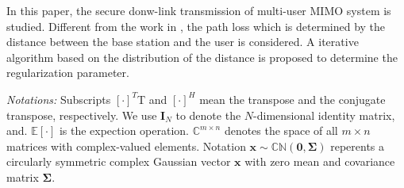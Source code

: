 \documentclass[12pt,journal,draftclsnofoot,onecolumn]{IEEEtran}
\begin{document}
 


In this paper, the secure donw-link transmission of multi-user MIMO system is studied. Different from the work in \cite{geraci2012secrecy,geraci2014physical}, the path loss which is determined by the distance between the base station and the user is considered. A iterative algorithm  based on the distribution of the distance is proposed to determine the regularization parameter.

\emph{Notations:} Subscripts $[\cdot]^T$T and $[\cdot]^H$ mean the transpose and
the conjugate transpose, respectively. We use $\mathbf{I}_{N}$  to denote the
$N$-dimensional identity matrix, and. $\mathbb{E}[\cdot]$ is the expection operation. $\mathbb{C}^{m \times n}$ denotes the space of all $m \times n$ matrices
with complex-valued elements. Notation $\mathbf{x} \sim \mathbb{CN}(\mathbf{0},\mathbf{\Sigma})$ reperents a
circularly symmetric complex Gaussian vector $\mathbf{x}$  with
zero mean and covariance matrix $\mathbf{\Sigma}$.
\end{document}
